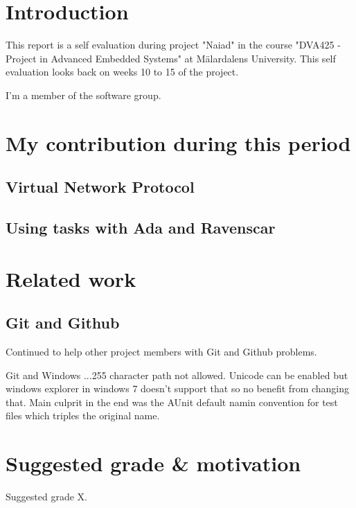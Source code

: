\section{Introduction}
This report is a self evaluation during project "Naiad" in the course
"DVA425 - Project in Advanced Embedded Systems" at M\"{a}lardalens University.
This self evaluation looks back on weeks 10 to 15 of the project.

I'm a member of the software group.

\section{My contribution during this period}

\subsection{Virtual Network Protocol}

\subsection{Using tasks with Ada and Ravenscar}

\section{Related work}

\subsection{Git and Github}
Continued to help other project members with Git and Github problems.

Git and Windows ...255 character path not allowed. Unicode can be enabled but
windows explorer in windows 7 doesn't support that so no benefit from changing
that. Main culprit in the end was the AUnit default namin convention for test
files which triples the original name.

\section{Suggested grade \& motivation}
Suggested grade X.\cite{*}
